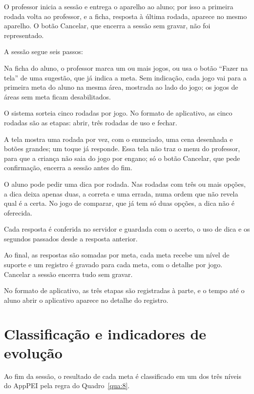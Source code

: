 O professor inicia a sessão e entrega o aparelho ao aluno; por isso a primeira rodada volta ao professor, e a ficha, resposta à última rodada, aparece no mesmo aparelho. O botão Cancelar, que encerra a sessão sem gravar, não foi representado.

A sessão segue seis passos:

\begin{passos}
  \item Na ficha do aluno, o professor marca um ou mais jogos, ou usa o botão “Fazer na tela” de uma sugestão, que já indica a meta. Sem indicação, cada jogo vai para a primeira meta do aluno na mesma área, mostrada ao lado do jogo; os jogos de áreas sem meta ficam desabilitados.
  \item O sistema sorteia cinco rodadas por jogo. No formato de aplicativo, as cinco rodadas são as etapas: abrir, três rodadas de uso e fechar.
  \item A tela mostra uma rodada por vez, com o enunciado, uma cena desenhada e botões grandes; um toque já responde. Essa tela não traz o menu do professor, para que a criança não saia do jogo por engano; só o botão Cancelar, que pede confirmação, encerra a sessão antes do fim.
  \item O aluno pode pedir uma dica por rodada. Nas rodadas com três ou mais opções, a dica deixa apenas duas, a correta e uma errada, numa ordem que não revela qual é a certa. No jogo de comparar, que já tem só duas opções, a dica não é oferecida.
  \item Cada resposta é conferida no servidor e guardada com o acerto, o uso de dica e os segundos passados desde a resposta anterior.
  \item Ao final, as respostas são somadas por meta, cada meta recebe um nível de suporte e um registro é gravado para cada meta, com o detalhe por jogo. Cancelar a sessão encerra tudo sem gravar.
\end{passos}

No formato de aplicativo, as três etapas são registradas à parte, e o tempo até o aluno abrir o aplicativo aparece no detalhe do registro.

\section{Classificação e indicadores de evolução}\label{sec:4.5}

Ao fim da sessão, o resultado de cada meta é classificado em um dos três níveis do AppPEI pela regra do Quadro~\ref{qua:8}.


